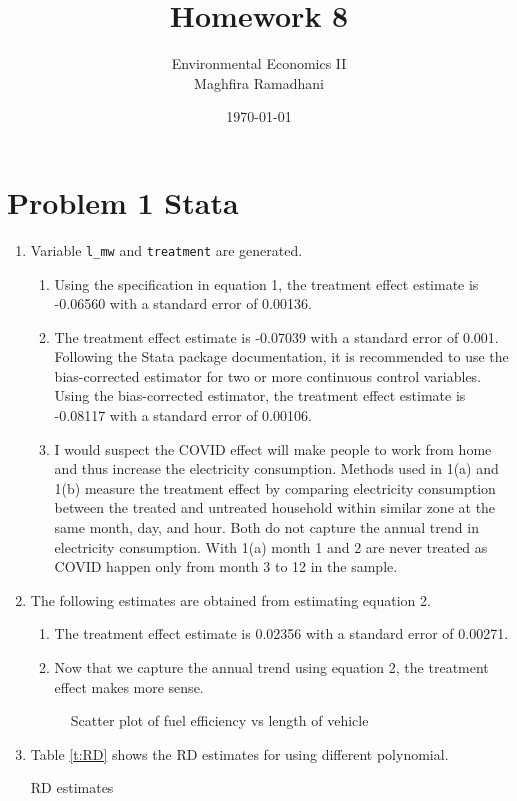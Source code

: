 \documentclass{article}
\begin{document}
 
\title{Homework 8}
\author{Environmental Economics II\\
Maghfira Ramadhani}
\date{\today}
\maketitle

\section*{Problem 1 Stata}
\begin{enumerate}
\item Variable \verb!l_mw! and \verb!treatment! are generated.
\begin{enumerate}
    \item Using the specification in equation 1, the treatment effect estimate is -0.06560 with a standard error of 0.00136.
    \item The treatment effect estimate is -0.07039 with a standard error of 0.001. Following the Stata package documentation, it is recommended to use the bias-corrected estimator for two or more continuous control variables. Using the bias-corrected estimator, the treatment effect estimate is -0.08117 with a standard error of 0.00106. 
    \item I would suspect the COVID effect will make people to work from home and thus increase the electricity consumption. Methods used in 1(a) and 1(b) measure the treatment effect by comparing electricity consumption between the treated and untreated household within similar zone at the same month, day, and hour. Both do not capture the annual trend in electricity consumption. With 1(a) month 1 and 2 are never treated as COVID happen only from month 3 to 12 in the sample.
\end{enumerate}
\item The following estimates are obtained from estimating equation 2.
\begin{enumerate}
    \item The treatment effect estimate is 0.02356 with a standard error of 0.00271.
    \item Now that we capture the annual trend using equation 2, the treatment effect makes more sense.
\end{enumerate}
\begin{figure}[H]
    \centering
    \caption{Scatter plot of fuel efficiency vs length of vehicle}
    \label{f1:scatter_plot} 
\end{figure}
\item Table \ref{t:RD} shows the RD estimates for using different polynomial.
\begin{table}[H]\centering
    \caption{RD estimates}
    \label{t:RD}
    \begin{threeparttable}
    \end{threeparttable}
    \end{table}
\end{enumerate}
\end{document}
